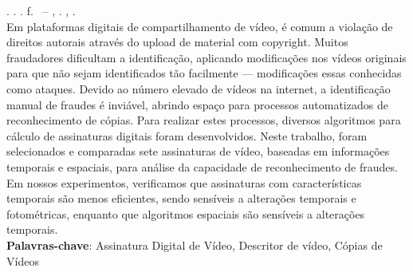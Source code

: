 
\begin{resumo}[RESUMO]
\begin{SingleSpacing}

\imprimirautorcitacao. \imprimirtitulo. \imprimirdata. \pageref {LastPage} f. \imprimirprojeto\ – \imprimirprograma, \imprimirinstituicao. \imprimirlocal, \imprimirdata.\\


Em plataformas digitais de compartilhamento de vídeo, é comum a violação de direitos autorais através do upload de material com copyright. Muitos fraudadores dificultam a identificação, aplicando modificações nos vídeos originais para que não sejam identificados tão facilmente --- modificações essas conhecidas como ataques. Devido ao número elevado de vídeos na internet, a identificação manual de fraudes é inviável, abrindo espaço para processos automatizados de reconhecimento de cópias. Para realizar estes processos, diversos algoritmos para cálculo de assinaturas digitais foram desenvolvidos. Neste trabalho, foram selecionados e comparadas sete assinaturas de vídeo, baseadas em informações temporais e espaciais, para análise da capacidade de reconhecimento de fraudes. Em nossos experimentos, verificamos que assinaturas com características temporais são menos eficientes, sendo sensíveis a alterações temporais e fotométricas, enquanto que algoritmos espaciais são sensíveis a alterações temporais. \\

\textbf{Palavras-chave}: Assinatura Digital de Vídeo, Descritor de vídeo, Cópias de Vídeos

\end{SingleSpacing}
\end{resumo}


